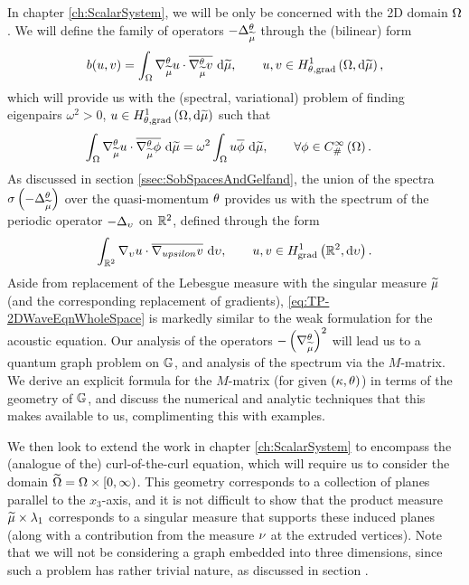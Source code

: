 In chapter \ref{ch:ScalarSystem}, we will be only be concerned with the 2D domain $\Omega$.
We will define the family of operators $-\Delta_{\widetilde{\mu}}^{\theta}$ through the (bilinear) form 
\begin{align*}
	b(u,v) = \int_{\Omega} \nabla^{\theta}_{\widetilde{\mu}} u\cdot\overline{\nabla^{\theta}_{\widetilde{\mu}} v}  \ \mathrm{d}\widetilde{\mu},
	\qquad u,v\in H^1_{\theta, \mathrm{grad}}\left( \Omega, \mathrm{d}\widetilde{\mu} \right),
\end{align*}
which will provide us with the (spectral, variational) problem of finding eigenpairs $\omega^2>0$, $u\in H^1_{\theta, \mathrm{grad}}\left( \Omega, \mathrm{d}\widetilde{\mu} \right)$ such that
\begin{align*}
	\int_{\Omega} \nabla^{\theta}_{\widetilde{\mu}} u\cdot\overline{\nabla^{\theta}_{\widetilde{\mu}}\phi}  \ \mathrm{d}\widetilde{\mu}
	&= \omega^2\int_{\Omega} u\overline{\phi}  \ \mathrm{d}\widetilde{\mu},
	\qquad\forall\phi\in C^{\infty}_{\#}\left( \Omega \right).
\end{align*}
As discussed in section \ref{ssec:SobSpacesAndGelfand}, the union of the spectra $\sigma\left( -\Delta_{\widetilde{\mu}}^{\theta} \right)$ over the quasi-momentum $\theta$ provides us with the spectrum of the periodic operator $-\Delta_{\upsilon}$ on $\mathbb{R}^2$, defined through the form
\begin{align} \label{eq:TP-2DWaveEqnWholeSpace}
	\int_{\mathbb{R}^2} \nabla_{\upsilon} u\cdot\overline{\nabla_{upsilon} v}  \ \mathrm{d}\upsilon,
	\qquad u,v\in H^1_\mathrm{grad}\left( \mathbb{R}^2, \mathrm{d}\upsilon \right).
\end{align}
Aside from replacement of the Lebesgue measure with the singular measure $\widetilde{\mu}$ (and the corresponding replacement of gradients), \eqref{eq:TP-2DWaveEqnWholeSpace} is markedly similar to the weak formulation for the acoustic equation.
Our analysis of the operators $-\left( \nabla^{\theta}_{\widetilde{\mu}} \right)^2$ will lead us to a quantum graph problem on $\mathbb{G}$, and analysis of the spectrum via the $M$-matrix.
We derive an explicit formula for the $M$-matrix (for given $\left( \kappa, \theta \right)$) in terms of the geometry of $\mathbb{G}$, and discuss the numerical and analytic techniques that this makes available to us, complimenting this with examples.

We then look to extend the work in chapter \ref{ch:ScalarSystem} to encompass the (analogue of the) curl-of-the-curl equation, which will require us to consider the domain $\widetilde{\Omega} = \Omega\times[0,\infty)$.
This geometry corresponds to a collection of planes parallel to the $x_3$-axis, and it is not difficult to show that the product measure $\widetilde{\mu}\times\lambda_1$ corresponds to a singular measure that supports these induced planes (along with a contribution from the measure $\nu$ at the extruded vertices).
Note that we will not be considering a graph embedded into three dimensions, since such a problem has rather trivial nature, as discussed in section .

